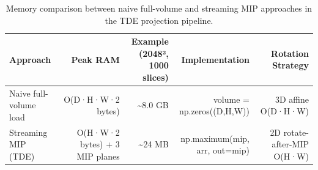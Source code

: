 \begin{table}[htbp]
\caption{Memory comparison between naive full-volume and streaming MIP approaches in the TDE projection pipeline.}
\label{tab:mip_memory}
\begin{tabular}{lrrrr}
\toprule
Approach & Peak RAM & Example (2048², 1000 slices) & Implementation & Rotation Strategy \\
\midrule
Naive full-volume load & O(D·H·W·2 bytes) & \textasciitilde 8.0 GB & volume = np.zeros((D,H,W)) & 3D affine O(D·H·W) \\
Streaming MIP (TDE) & O(H·W·2 bytes) + 3 MIP planes & \textasciitilde 24 MB & np.maximum(mip, arr, out=mip) & 2D rotate-after-MIP O(H·W) \\
\bottomrule
\end{tabular}
\end{table}
